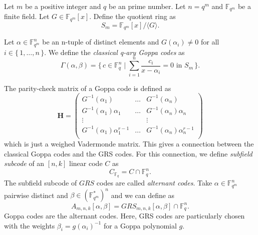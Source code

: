 Let $m$ be a positive integer and $q$ be an prime number. Let $n = q^m$ and $\mathbb{F}_{q^m}$ be a finite field. Let $G \in \mathbb{F}_{q^m}[x]$. Define the quotient ring as
\[
S_m = \mathbb{F}_{q^m}[x] / \langle G \rangle.
\]

\begin{definition}
Let $\alpha \in \mathbb{F}_{q^m}^n$ be an n-tuple of distinct elements and $G(\alpha_i) \neq 0$ for all $i \in \{\,1, \dots, n \,\}$. We define the \textit{classical q-ary Goppa codes} as
\[
\Gamma(\alpha, \beta) = 
\{\,c \in \mathbb{F}_q^n \mid \sum_{i = 1}^n \frac{c_i}{x - \alpha_i} = 0 \text{ in } S_m \,\}.
\]
\end{definition}

The parity-check matrix of a Goppa code is defined as
\[
\mathbf{H}=\begin{pmatrix}
    G^{-1}(\alpha_1)&\dots&G^{-1}(\alpha_n)\\
    G^{-1}(\alpha_1)\alpha_1&\dots&G^{-1}(\alpha_n)\alpha_n\\
    \vdots&&\vdots\\
    G^{-1}(\alpha_1)\alpha_1^{r-1}&\dots&G^{-1}(\alpha_n)\alpha_n^{r-1}\\
\end{pmatrix}
\]
which is just a weighed Vadermonde matrix. This gives a connection between the classical Goppa codes and the GRS codes. 
For this connection, we define \textit{subfield subcode} of an $[n,k]$ linear code $C$ as 
\[
C_{\mathbb{F}_q} = C \cap\mathbb{F}_q^n.
\]
The subfield subcode of $GRS$ codes are called \textit{alternant codes}. Take $\alpha\in \mathbb{F}_{q^m}^n$ pairwise distinct and $\beta\in(\mathbb{F}_{q^m}^\ast)^n$ and we can define as
\[
A_{m,n,k}[\alpha,\beta]=GRS_{m,n,k}[\alpha,\beta]\cap\mathbb{F}_q^n.
\]
Goppa codes are the alternant codes. Here, GRS codes are particularly chosen with the weights $\beta_i = g(\alpha_i)^{-1}$ for a Goppa polynomial $g$.\\[0.2cm] 

